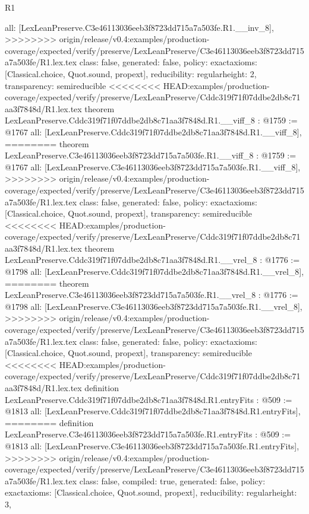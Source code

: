 \begin{lexlean}{R1}
\begin{coremodule}
{{{{{{{{{{{{  all: [LexLeanPreserve.C3e46113036eeb3f8723dd715a7a503fe.R1.__inv_8],
>>>>>>>> origin/release/v0.4:examples/production-coverage/expected/verify/preserve/LexLeanPreserve/C3e46113036eeb3f8723dd715a7a503fe/R1.lex.tex
  class: false,
  generated: false,
  policy: exact{axioms: [Classical.choice, Quot.sound, propext]},
  reducibility: regular{height: 2},
  transparency: semireducible
}
<<<<<<<< HEAD:examples/production-coverage/expected/verify/preserve/LexLeanPreserve/Cddc319f71f07ddbe2db8c71aa3f7848d/R1.lex.tex
theorem LexLeanPreserve.Cddc319f71f07ddbe2db8c71aa3f7848d.R1.__viff_8 : @1759 := @1767 {
  all: [LexLeanPreserve.Cddc319f71f07ddbe2db8c71aa3f7848d.R1.__viff_8],
========
theorem LexLeanPreserve.C3e46113036eeb3f8723dd715a7a503fe.R1.__viff_8 : @1759 := @1767 {
  all: [LexLeanPreserve.C3e46113036eeb3f8723dd715a7a503fe.R1.__viff_8],
>>>>>>>> origin/release/v0.4:examples/production-coverage/expected/verify/preserve/LexLeanPreserve/C3e46113036eeb3f8723dd715a7a503fe/R1.lex.tex
  class: false,
  generated: false,
  policy: exact{axioms: [Classical.choice, Quot.sound, propext]},
  transparency: semireducible
}
<<<<<<<< HEAD:examples/production-coverage/expected/verify/preserve/LexLeanPreserve/Cddc319f71f07ddbe2db8c71aa3f7848d/R1.lex.tex
theorem LexLeanPreserve.Cddc319f71f07ddbe2db8c71aa3f7848d.R1.__vrel_8 : @1776 := @1798 {
  all: [LexLeanPreserve.Cddc319f71f07ddbe2db8c71aa3f7848d.R1.__vrel_8],
========
theorem LexLeanPreserve.C3e46113036eeb3f8723dd715a7a503fe.R1.__vrel_8 : @1776 := @1798 {
  all: [LexLeanPreserve.C3e46113036eeb3f8723dd715a7a503fe.R1.__vrel_8],
>>>>>>>> origin/release/v0.4:examples/production-coverage/expected/verify/preserve/LexLeanPreserve/C3e46113036eeb3f8723dd715a7a503fe/R1.lex.tex
  class: false,
  generated: false,
  policy: exact{axioms: [Classical.choice, Quot.sound, propext]},
  transparency: semireducible
}
<<<<<<<< HEAD:examples/production-coverage/expected/verify/preserve/LexLeanPreserve/Cddc319f71f07ddbe2db8c71aa3f7848d/R1.lex.tex
definition LexLeanPreserve.Cddc319f71f07ddbe2db8c71aa3f7848d.R1.entryFits : @509 := @1813 {
  all: [LexLeanPreserve.Cddc319f71f07ddbe2db8c71aa3f7848d.R1.entryFits],
========
definition LexLeanPreserve.C3e46113036eeb3f8723dd715a7a503fe.R1.entryFits : @509 := @1813 {
  all: [LexLeanPreserve.C3e46113036eeb3f8723dd715a7a503fe.R1.entryFits],
>>>>>>>> origin/release/v0.4:examples/production-coverage/expected/verify/preserve/LexLeanPreserve/C3e46113036eeb3f8723dd715a7a503fe/R1.lex.tex
  class: false,
  compiled: true,
  generated: false,
  policy: exact{axioms: [Classical.choice, Quot.sound, propext]},
  reducibility: regular{height: 3},
}}}}}}}}}}}}}}}
\end{coremodule}
\end{lexlean}
